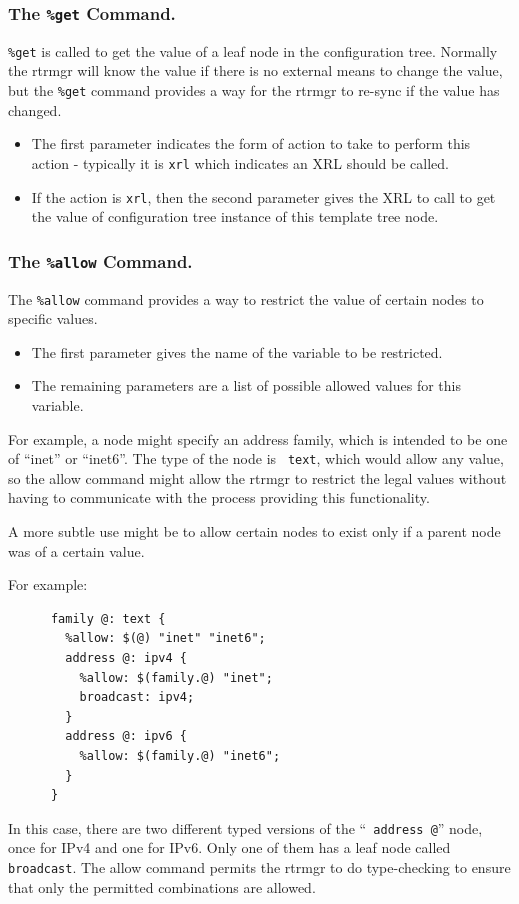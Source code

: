 \documentclass[11pt]{article}
\begin{document}
\subsubsection{The {\tt \%get} Command.}
{\tt \%get} is called to get the value of a leaf node in the
configuration tree.  Normally the rtrmgr will know the value if there
is no external means to change the value, but the {\tt \%get} command
provides a way for the rtrmgr to re-sync if the value has changed.
\begin{itemize}
\item The first parameter indicates the form of action to take to perform
this action - typically it is {\tt xrl} which indicates an XRL should
be called.
\item If the action is {\tt xrl}, then the second parameter gives the XRL to
call to get the value of configuration tree instance of this template
tree node.
\end{itemize}
\subsubsection{The {\tt \%allow} Command.}
The {\tt \%allow} command provides a way to restrict the value of
certain nodes to specific values.
\begin{itemize}
\item The first parameter gives the name of the variable to be restricted.
\item The remaining parameters are a list of possible allowed values for
this variable.
\end{itemize}
For example, a node might specify an address family, which is intended
to be one of ``inet'' or ``inet6''.  The type of the node is {\tt
text}, which would allow any value, so the allow command might allow
the rtrmgr to restrict the legal values without having to
communicate with the process providing this functionality.

A more subtle use might be to allow certain nodes to exist only if a
parent node was of a certain value.

For example:
\begin{verbatim}
      family @: text {
        %allow: $(@) "inet" "inet6";
        address @: ipv4 {
          %allow: $(family.@) "inet";
          broadcast: ipv4;
        }
        address @: ipv6 {
          %allow: $(family.@) "inet6";
        }
      }
\end{verbatim}
In this case, there are two different typed versions of the ``{\tt
address @}'' node, once for IPv4 and one for IPv6.  Only one of them has
a leaf node called {\tt broadcast}.  The allow command permits the
rtrmgr to do type-checking to ensure that only the permitted
combinations are allowed.
\newpage
\end{document}
